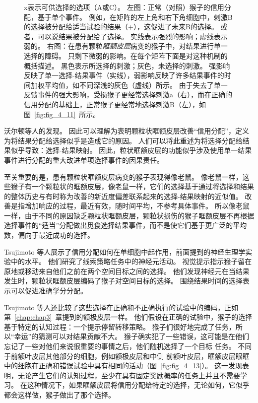 \begin{figure}[!htb]
{		x表示可供选择的选项（A或C）。
		左图：正常（对照）猴子的信用分配，基于单个事件。
		例如，在矩阵的左上角和右下角细胞中，刺激B的选择被分配给适当试验的结果（+），这促进了未来B的选择。
		或者，可以说结果被分配给了选择。
		实线表示强烈的影响；虚线表示弱的。
		右图：在患有颗粒\textit{眶额皮层}病变的猴子中，对结果进行单一选择的障碍。
		只剩下微弱的影响。在每个矩阵下面是对这种机制的概括描述。
		黑色表示所选择的刺激；灰色，未选择的刺激。
		强影响反映了单一选择-结果事件（实线），弱影响反映了许多结果事件的时间加权平均值，如不同深浅的灰色（虚线）所示。
		由于失去了单一反馈事件的强大影响，受损猴子更经常选择刺激a（右），而在正确的信用分配的基础上，正常猴子更经常地选择刺激B（左），如图~\ref{fig:fig_4_11}~所示。}
	\label{fig:fig_4_12}
\end{figure}


沃尔顿等人的发现。
因此可以理解为表明颗粒状眶额皮层改善“信用分配”，定义为将结果分配给选择似乎是造成它的原因。
人们可以将此重述为将选择分配给结果似乎导致：选择-结果映射。
因此，粒状眶额皮层的功能似乎涉及使用单一结果事件进行分配的重大改进单项选择事件的因果责任。\par


至关重要的是，患有颗粒状眶额皮层病变的猴子表现得像老鼠。
像老鼠一样，这些猴子有一个颗粒状的眶额皮层，像老鼠一样，它们的选择基于通过将选择和结果的整体历史与有时称为改善的新近度偏差联系起来的选择-结果映射的近似值\cite{herrnstein1991melioration}。
改善是指增加响应的过程，最近有效，随时间平均，不参考具体事件。
所以像老鼠一样，由于不同的原因缺乏颗粒状眶额皮层，颗粒状损伤的猴子眶额皮层不再根据选择事件的“适当”分配做出觅食选择结果事件，而不是使它们基于更广泛的平均数，偏向于最近成功的选择。\par


Tsujimoto 等人\cite{tsujimoto2009monkey}展示了信用分配如何在单细胞中起作用，前面提到的神经生理学实验中的水平。
他们研究了线索策略任务中的神经元活动。
视觉提示指示猴子留在原地或移动来自他们之前在两个空间目标之间的选择。
他们发现神经元在当结果发生时，颗粒状眶额皮层编码了猴子对空间目标的选择。
围绕结果时间的选择表示可以促进准确学分分配。\par


Tsujimoto 等人还比较了这些选择在正确和不正确执行的试验中的编码，正如第~\ref{chap:chap3}~章提到的额极皮层一样。
他们假设在正确的试验中，猴子的选择基于特定的认知过程：一个提示停留转移策略。
猴子们很好地完成了任务，所以“幸运”的猜测可以对结果贡献不大。
猴子确实犯了一些错误，这可能是在他们忘记了一些对他们来说很重要的事情之后，他们随机选择了一个目标
任务。
不同于前额叶皮层其他部分的细胞，例如额极皮层和中侧 前额叶皮层，眶额皮层眼眶中的细胞在正确和错误试验中具有相同的活动（图~\ref{fig:fig_4_13}）。
这一发现表明，无论产生它们的认知过程，至少在具有固定奖励概率的任务上并且不需要学习\cite{tsujimoto2011frontal}。
在这种情况下，如果眶额皮层将信用分配给特定的选择，无论如何，它似乎都会这样做，猴子做出了那个选择。\par



